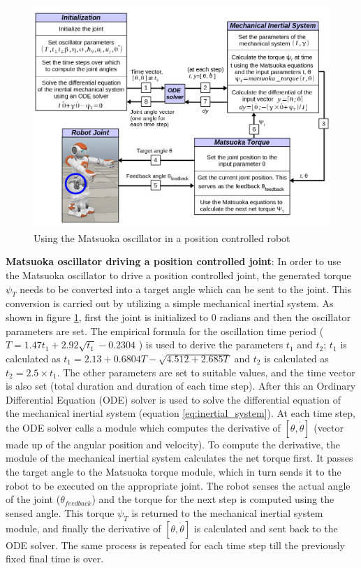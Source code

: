 \documentclass[12pt,twoside]{article}
\theoremstyle{plain}
\theoremstyle{definition}
\theoremstyle{remark}
\begin{document}
\begin{figure}[htbp]
\centering
\includegraphics[scale=0.45]{figures/robot_joint_control.png}
\caption{Using the Matsuoka oscillator in a position controlled robot}
\label{fig:robot_joint_control}
\end{figure}

\vspace{10pt}

\textbf{Matsuoka oscillator driving a position controlled joint}: In order to use the Matsuoka oscillator to drive a position controlled joint, the generated torque $\psi_T$ needs to be converted into a target angle which can be sent to the joint. This conversion is carried out by utilizing a simple mechanical inertial system. As shown in figure \ref{fig:robot_joint_control}, first the joint is initialized to 0 radians and then the oscillator parameters are set. The empirical formula for the oscillation time period ($T=1.47t_1 + 2.92\sqrt{t_1} - 0.2304$ \cite{Ronsse2009}) is used to derive the parameters $t_1$ and $t_2$; $t_1$ is calculated as $t_1=2.13 + 0.6804T - \sqrt{4.512 + 2.685T}$ and $t_2$ is calculated as $t_2=2.5 \times t_1$. The other parameters are set to suitable values, and the time vector is also set (total duration and duration of each time step). After this an Ordinary Differential Equation (ODE) solver is used to solve the differential equation of the mechanical inertial system (equation \ref{eq:inertial_system}). At each time step, the ODE solver calls a module which computes the derivative of $[\theta, \dot{\theta}]$ (vector made up of the angular position and velocity). To compute the derivative, the module of the mechanical inertial system calculates the net torque first. It passes the target angle to the Matsuoka torque module, which in turn sends it to the robot to be executed on the appropriate joint. The robot senses the actual angle of the joint ($\theta_{feedback}$) and the torque for the next step is computed using the sensed angle. This torque $\psi_T$ is returned to the mechanical inertial system module, and finally the derivative of $[\theta, \dot{\theta}]$ is calculated and sent back to the ODE solver. The same process is repeated for each time step till the previously fixed final time is over.\\
\end{document}
